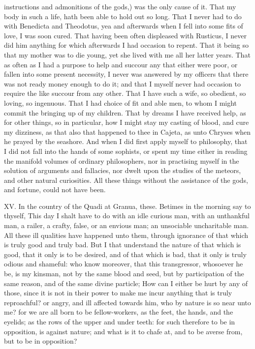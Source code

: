 instructions and admonitions of the gods,) was the only cause of it. That
my body in such a life, hath been able to hold out so long. That I never
had to do with Benedicta and Theodotus, yea and afterwards when I fell
into some fits of love, I was soon cured. That having been often
displeased with Rusticus, I never did him anything for which afterwards I
had occasion to repent. That it being so that my mother was to die young,
yet she lived with me all her latter years. That as often as I had a
purpose to help and succour any that either were poor, or fallen into some
present necessity, I never was answered by my officers that there was not
ready money enough to do it; and that I myself never had occasion to
require the like succour from any other. That I have such a wife, so
obedient, so loving, so ingenuous. That I had choice of fit and able men,
to whom I might commit the bringing up of my children. That by dreams I
have received help, as for other things, so in particular, how I might
stay my casting of blood, and cure my dizziness, as that also that
happened to thee in Cajeta, as unto Chryses when he prayed by the
seashore. And when I did first apply myself to philosophy, that I did not
fall into the hands of some sophists, or spent my time either in reading
the manifold volumes of ordinary philosophers, nor in practising myself in
the solution of arguments and fallacies, nor dwelt upon the studies of the
meteors, and other natural curiosities. All these things without the
assistance of the gods, and fortune, could not have been.

XV. In the country of the Quadi at Granua, these. Betimes in the morning
say to thyself, This day I shalt have to do with an idle curious man, with
an unthankful man, a railer, a crafty, false, or an envious man; an
unsociable uncharitable man. All these ill qualities have happened unto
them, through ignorance of that which is truly good and truly bad. But I
that understand the nature of that which is good, that it only is to be
desired, and of that which is bad, that it only is truly odious and
shameful: who know moreover, that this transgressor, whosoever he be, is
my kinsman, not by the same blood and seed, but by participation of the
same reason, and of the same divine particle; How can I either be hurt by
any of those, since it is not in their power to make me incur anything
that is truly reproachful? or angry, and ill affected towards him, who by
nature is so near unto me? for we are all born to be fellow-workers, as
the feet, the hands, and the eyelids; as the rows of the upper and under
teeth: for such therefore to be in opposition, is against nature; and what
is it to chafe at, and to be averse from, but to be in opposition?

